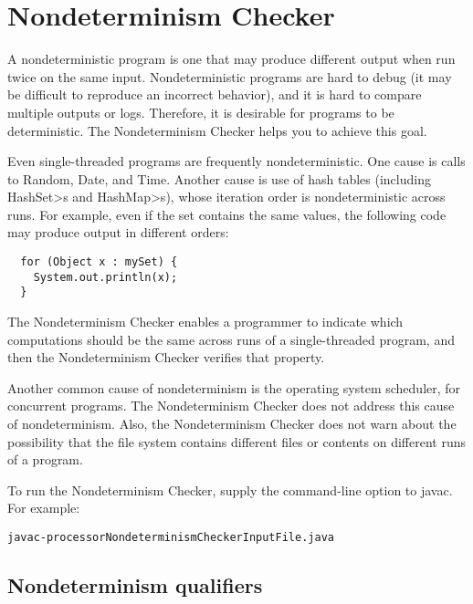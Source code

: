 \htmlhr
\chapter{Nondeterminism Checker\label{nondeterminism-checker}}

A nondeterministic program is one that may produce different output when
run twice on the same input.  Nondeterministic programs are hard to debug
(it may be difficult to reproduce an incorrect behavior), and it is hard to
compare multiple outputs or logs.
Therefore, it is desirable for programs to be deterministic.
The Nondeterminism Checker helps you to achieve this goal.

Even single-threaded programs are frequently nondeterministic.
One cause is calls to Random, Date, and Time.
Another cause is use of hash tables (including \<HashSet>s and
\<HashMap>s), whose iteration order is nondeterministic across runs.
For example, even if the set contains the same values, the following code
may produce output in different orders:

\begin{Verbatim}
  for (Object x : mySet) {
    System.out.println(x);
  }
\end{Verbatim}

The Nondeterminism Checker enables a programmer to indicate which
computations should be the same across runs of a single-threaded program,
and then the Nondeterminism Checker verifies that property.

Another common cause of nondeterminism is the operating system scheduler,
for concurrent programs.  The Nondeterminism Checker does not address this
cause of nondeterminism.  Also, the Nondeterminism Checker does not warn
about the possibility that the file system contains different files or
contents on different runs of a program.

To run the Nondeterminism Checker, supply the
command-line option to javac.
For example:

\begin{alltt}
  javac -processor NondeterminismChecker InputFile.java
\end{alltt}



\section{Nondeterminism qualifiers\label{nondeterminism-qualifiers}}


